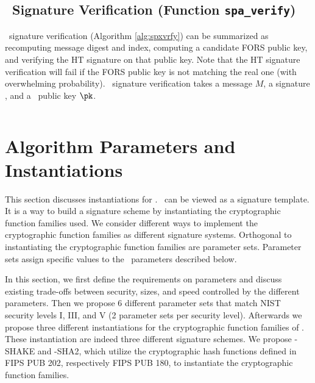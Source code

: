 \begin{algorithm}[ht]
    \inputminted[breaklines,linenos,tabsize=2,mathescape,escapeinside=||]{C}{code/spa_sign.cs}
    \caption{ \texttt{spa\_sign} --- Generating a \SPHINCSA\ signature.}
    \label{alg:spxsign}
\end{algorithm}

\subsection{\SPHINCSA\ Signature Verification (Function \texttt{spa\_verify})}

\SPHINCSA\ signature verification (Algorithm \ref{alg:spxvrfy}) can be summarized as recomputing message digest and index, computing a candidate FORS public key, and verifying the HT signature on that public key. Note that the HT signature verification will fail if the FORS public key is not matching the real one (with overwhelming probability). \SPHINCSA\ signature verification takes a message $M$, a signature \sig, and a \SPHINCSA\ public key $\pk$.

\begin{algorithm}[ht]
    \inputminted[breaklines,linenos,tabsize=2,mathescape,escapeinside=||]{C}{code/spa_verify.cs}
    \caption{ \texttt{spa\_verify} --- Verify a \SPHINCSA\ signature $\bf SIG$ on a message $M$ using a \SPHINCSA\ public key $\bf PK$.}
    \label{alg:spxvrfy}
\end{algorithm}

\section{Algorithm Parameters and Instantiations}
\label{sec:instantiations}

This section discusses instantiations for \SPHINCSA. \SPHINCSA\ can be viewed as a signature template. It is a way to build a signature scheme by instantiating the cryptographic function families used. We consider different ways to implement the cryptographic function families as different signature systems. Orthogonal to instantiating the cryptographic function families are parameter sets. Parameter sets assign specific values to the \SPHINCSA\ parameters described below.

In this section, we first define the requirements on parameters and discuss existing trade-offs between security, sizes, and speed controlled by the different parameters. Then we propose 6 different parameter sets that match NIST security levels I, III, and V (2 parameter sets per security level). Afterwards we propose three different instantiations for the cryptographic function families of \SPHINCSA. These instantiation are indeed three different signature schemes. We propose \SPHINCSA-SHAKE and \SPHINCSA-SHA2, which utilize the cryptographic hash functions defined in FIPS PUB 202, respectively FIPS PUB 180, to instantiate the cryptographic function families.


